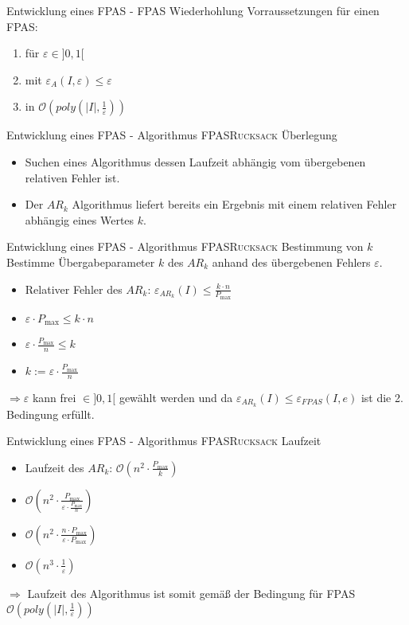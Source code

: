 \begin{frame}{Entwicklung eines FPAS - FPAS Wiederhohlung}
	Vorraussetzungen für einen FPAS:
	\begin{enumerate}
		\item für $\varepsilon \in ]0, 1[$ 
		\item mit $\varepsilon_A(I,\varepsilon) \le \varepsilon$
		\item in $\displaystyle \mathcal O(poly(\vert I \vert, \frac{1}{\varepsilon}))$
	\end{enumerate}
\end{frame}

\begin{frame}{Entwicklung eines FPAS - Algorithmus \textsc{FPASRucksack} Überlegung}
	\begin{itemize}
		\item
		Suchen eines Algorithmus dessen Laufzeit abhängig vom übergebenen relativen Fehler ist.
		\item
		Der $AR_k$ Algorithmus liefert bereits ein Ergebnis mit einem relativen Fehler abhängig eines Wertes $k$.
	\end{itemize}
\end{frame}

\begin{frame}{Entwicklung eines FPAS - Algorithmus \textsc{FPASRucksack} Bestimmung von $k$}
	Bestimme Übergabeparameter $k$ des $AR_k$ anhand des übergebenen Fehlers $\varepsilon$.
	\begin{itemize}
		\item
		Relativer Fehler des $AR_k$: $\displaystyle \varepsilon_{AR_k}(I) \le \frac{k \cdot n}{P_{\max}}$
		\pause
		\item[]
		$\displaystyle \varepsilon \cdot P_{\max} \le k \cdot n$
		\item[]
		$\displaystyle \varepsilon \cdot \frac{P_{\max}}{n} \le k$
		\item[]
		$\displaystyle k := \varepsilon \cdot \frac{P_{\max}}{n}$
	\end{itemize}

$\Rightarrow \varepsilon$ kann frei $\in]0,1[$ gewählt werden und da $\varepsilon_{AR_k}(I) \le \varepsilon_{FPAS}(I,e)$  ist die 2. Bedingung erfüllt.

\end{frame}
\begin{frame}{Entwicklung eines FPAS - Algorithmus \textsc{FPASRucksack} Laufzeit}
	\begin{itemize}
		\item
		Laufzeit des $AR_k$: $\displaystyle \mathcal O(n^2 \cdot \frac{P_{\max}}{k})$
		\pause
		\item[]
		$\displaystyle \mathcal O(n^2 \cdot \frac{P_{\max}}{\varepsilon \cdot \frac{P_{\max}}{n}})$
		\item[]
		$\displaystyle \mathcal O(n^2 \cdot \frac{n \cdot P_{\max}}{\varepsilon \cdot P_{\max}})$
		\item[]
		$\displaystyle \mathcal O(n^3 \cdot \frac{1}{\varepsilon})$
	\end{itemize}
$\Rightarrow$ Laufzeit des Algorithmus ist somit gemäß der Bedingung für FPAS $\displaystyle \mathcal O(poly(\vert I \vert, \frac{1}{\varepsilon}))$
\end{frame}